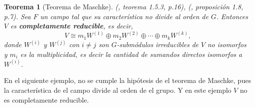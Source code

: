 \documentclass[12pt]{book}
\newtheorem{theorem}{Teorema}[section]
\theoremstyle{definition}
\newcounter{in}
\begin{document}
\begin{theorem}[Teorema de Maschke]{\normalfont (\cite{sagan2001symmetric}, teorema
  1.5.3, p.16), (\cite{fulton1991representation}, proposición 1.8, p.7).
  \label{maschke}}
  Sea $F$ un campo tal que su característica no
  divide al orden de $G$. %
  Entonces $V$ es \textbf{completamente reducible}, es decir,
  \begin{equation*}
    V\cong m_{1}W^{(1)}\oplus m_{2}W^{(2)}\oplus\cdots \oplus m_{k}W^{(k)},
  \end{equation*}
donde $W^{(i)}$ y $W^{(j)}$ con $i\neq j$ son $G$-submódulos
irreducibles de $V$ no isomorfos y $m_{i}$ es la multiplicidad, es
decir la cantidad de sumandos directos isomorfos a $W^{(i)}$.
\end{theorem}
En el siguiente ejemplo, no se cumple la hipótesis de el teorema de
Maschke, pues la característica de el campo divide al orden de el
grupo. Y en este ejemplo $V$ no es completamente reducible.
\end{document}
